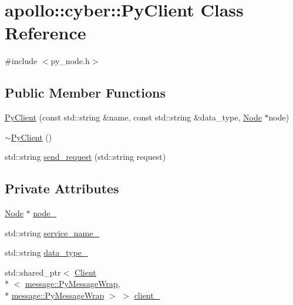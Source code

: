 \hypertarget{classapollo_1_1cyber_1_1PyClient}{\section{apollo\-:\-:cyber\-:\-:Py\-Client Class Reference}
\label{classapollo_1_1cyber_1_1PyClient}
}


{\ttfamily \#include $<$py\-\_\-node.\-h$>$}

\subsection*{Public Member Functions}
\begin{DoxyCompactItemize}
\item 
\hyperlink{classapollo_1_1cyber_1_1PyClient_aa7214912717a75a177d899bb9c38b8f7}{Py\-Client} (const std\-::string \&name, const std\-::string \&data\-\_\-type, \hyperlink{classapollo_1_1cyber_1_1Node}{Node} $\ast$node)
\item 
\hyperlink{classapollo_1_1cyber_1_1PyClient_a37a081098f9b01ed0ac0687836e33b56}{$\sim$\-Py\-Client} ()
\item 
std\-::string \hyperlink{classapollo_1_1cyber_1_1PyClient_a5d689436e5fa0a5d23064b2626469ca1}{send\-\_\-request} (std\-::string request)
\end{DoxyCompactItemize}
\subsection*{Private Attributes}
\begin{DoxyCompactItemize}
\item 
\hyperlink{classapollo_1_1cyber_1_1Node}{Node} $\ast$ \hyperlink{classapollo_1_1cyber_1_1PyClient_a01dad8b3f92d223ae877dde18f1a8e78}{node\-\_\-}
\item 
std\-::string \hyperlink{classapollo_1_1cyber_1_1PyClient_ab9e092b072bf453da77f0ef9d9a5aeea}{service\-\_\-name\-\_\-}
\item 
std\-::string \hyperlink{classapollo_1_1cyber_1_1PyClient_a10b154765aeedf03563f23e8a341a91e}{data\-\_\-type\-\_\-}
\item 
std\-::shared\-\_\-ptr$<$ \hyperlink{classapollo_1_1cyber_1_1Client}{Client}\\*
$<$ \hyperlink{classapollo_1_1cyber_1_1message_1_1PyMessageWrap}{message\-::\-Py\-Message\-Wrap}, \\*
\hyperlink{classapollo_1_1cyber_1_1message_1_1PyMessageWrap}{message\-::\-Py\-Message\-Wrap} $>$ $>$ \hyperlink{classapollo_1_1cyber_1_1PyClient_a77642834603486811a27135ba0634481}{client\-\_\-}
\end{DoxyCompactItemize}


